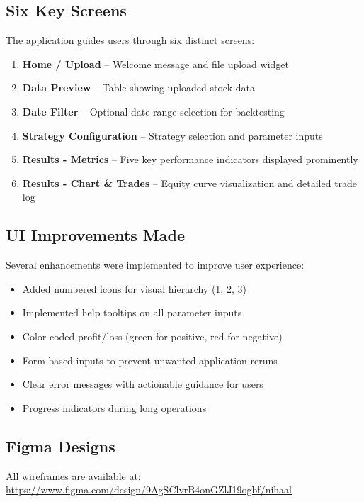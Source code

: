 \documentclass[11pt,a4paper]{article}
\begin{document}
\subsection{Six Key Screens}

The application guides users through six distinct screens:

\begin{enumerate}
    \item \textbf{Home / Upload} -- Welcome message and file upload widget
    \item \textbf{Data Preview} -- Table showing uploaded stock data
    \item \textbf{Date Filter} -- Optional date range selection for backtesting
    \item \textbf{Strategy Configuration} -- Strategy selection and parameter inputs
    \item \textbf{Results - Metrics} -- Five key performance indicators displayed prominently
    \item \textbf{Results - Chart \& Trades} -- Equity curve visualization and detailed trade log
\end{enumerate}

\subsection{UI Improvements Made}

Several enhancements were implemented to improve user experience:

\begin{itemize}[noitemsep]
    \item Added numbered icons for visual hierarchy (1, 2, 3)
    \item Implemented help tooltips on all parameter inputs
    \item Color-coded profit/loss (green for positive, red for negative)
    \item Form-based inputs to prevent unwanted application reruns
    \item Clear error messages with actionable guidance for users
    \item Progress indicators during long operations
\end{itemize}

\subsection{Figma Designs}

All wireframes are available at: \url{https://www.figma.com/design/9AgSClvrB4onGZlJ19ogbf/nihaal}
\end{document}
